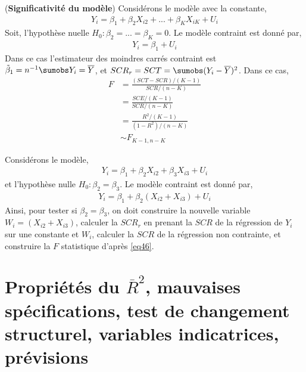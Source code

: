 \begin{exemple}
(\textbf{Significativité du modèle}) Considérons le modèle avec la constante,
\begin{align*}
Y_i = \beta_1 + \beta_2X_{i2} + ...+\beta_KX_{iK} + U_i
\end{align*}
Soit, l'hypothèse nuelle $H_0: \beta_2 = ...=\beta_K =0$. Le modèle contraint est donné par,
\begin{align*}
Y_i = \beta_1 + U_i
\end{align*}
Dans ce cas l'estimateur des moindres carrés contraint est $\tilde{\beta}_1 =n^{-1}\sumobs Y_i = \overline{Y}$, et $SCR_r =SCT =\sumobs (Y_i-\overline{Y})^2$. Dans ce cas,
\begin{align*}
F &=\frac{(SCT -SCR)/(K-1)}{SCR/(n-K)}\\
&=\frac{SCE/(K-1)}{SCR/(n-K)}\\
&= \frac{R^2/(K-1)}{(1-R^2)/(n-K)}\\
&\sim F_{K-1, n-K}
\end{align*}
\label{ex1}
\end{exemple}
\begin{exemple} Considérons le modèle,
\begin{align*}
Y_i = \beta_1 + \beta_2X_{i2} + \beta_3X_{i3}+U_i
\end{align*}
et l'hypothèse nulle $H_0: \beta_2 = \beta_3$. Le modèle contraint est donné par,
\begin{align*}
Y_i=\beta_1+\beta_2(X_{i2}+X_{i3})+U_i
\end{align*}
Ainsi, pour tester si $\beta_2=\beta_3$, on doit construire la nouvelle variable $W_i = (X_{i2}+X_{i3})$, calculer la $SCR_r$ en prenant la $SCR$ de la régression de $Y_i$ sur une constante et $W_i$, calculer la $SCR$ de la régression non contrainte, et construire la $F$ statistique d'après \eqref{eq46}.
\label{ex2}
\end{exemple}

\newpage
\section{Propriétés du $\overline{R}^2$, mauvaises spécifications, test de changement structurel, variables indicatrices, prévisions}


